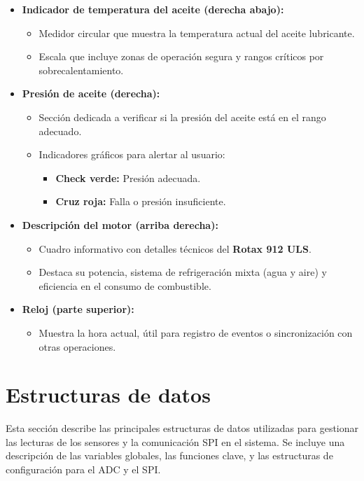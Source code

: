 \begin{itemize}
    \item \textbf{Indicador de temperatura del aceite (derecha abajo):}
    \begin{itemize}
        \item Medidor circular que muestra la temperatura actual del aceite lubricante.
        \item Escala que incluye zonas de operación segura y rangos críticos por sobrecalentamiento.
    \end{itemize}

    \item \textbf{Presión de aceite (derecha):}
    \begin{itemize}
        \item Sección dedicada a verificar si la presión del aceite está en el rango adecuado.
        \item Indicadores gráficos para alertar al usuario:
        \begin{itemize}
            \item \textbf{Check verde:} Presión adecuada.
            \item \textbf{Cruz roja:} Falla o presión insuficiente.
        \end{itemize}
    \end{itemize}

    \item \textbf{Descripción del motor (arriba derecha):}
    \begin{itemize}
        \item Cuadro informativo con detalles técnicos del \textbf{Rotax 912 ULS}.
        \item Destaca su potencia, sistema de refrigeración mixta (agua y aire) y eficiencia en el consumo de combustible.
    \end{itemize}

    \item \textbf{Reloj (parte superior):}
    \begin{itemize}
        \item Muestra la hora actual, útil para registro de eventos o sincronización con otras operaciones.
    \end{itemize}
\end{itemize}

    
\section{Estructuras de datos}

Esta sección describe las principales estructuras de datos utilizadas para gestionar las lecturas de los sensores y la comunicación SPI en el sistema. Se incluye una descripción de las variables globales, las funciones clave, y las estructuras de configuración para el ADC y el SPI.

